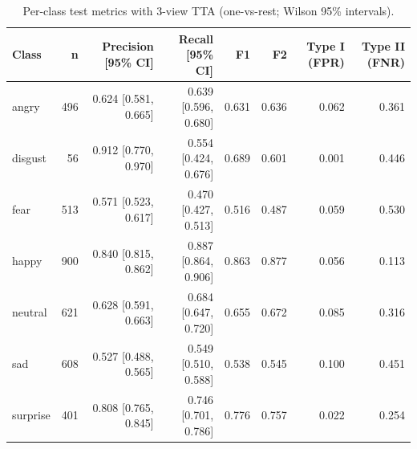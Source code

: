 \begin{table}[ht]
\centering
\small
\caption{Per-class test metrics with 3-view TTA (one-vs-rest; Wilson 95\% intervals).}
\label{tab:perclass}
\begin{tabular}{lrrrrrrr}
\toprule
Class & n & Precision [95\% CI] & Recall [95\% CI] & F1 & F2 & Type I (FPR) & Type II (FNR) \\
\midrule
angry & 496 & 0.624 [0.581, 0.665] & 0.639 [0.596, 0.680] & 0.631 & 0.636 & 0.062 & 0.361 \\
disgust & 56 & 0.912 [0.770, 0.970] & 0.554 [0.424, 0.676] & 0.689 & 0.601 & 0.001 & 0.446 \\
fear & 513 & 0.571 [0.523, 0.617] & 0.470 [0.427, 0.513] & 0.516 & 0.487 & 0.059 & 0.530 \\
happy & 900 & 0.840 [0.815, 0.862] & 0.887 [0.864, 0.906] & 0.863 & 0.877 & 0.056 & 0.113 \\
neutral & 621 & 0.628 [0.591, 0.663] & 0.684 [0.647, 0.720] & 0.655 & 0.672 & 0.085 & 0.316 \\
sad & 608 & 0.527 [0.488, 0.565] & 0.549 [0.510, 0.588] & 0.538 & 0.545 & 0.100 & 0.451 \\
surprise & 401 & 0.808 [0.765, 0.845] & 0.746 [0.701, 0.786] & 0.776 & 0.757 & 0.022 & 0.254 \\
\bottomrule
\end{tabular}
\end{table}